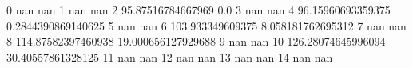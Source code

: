 0 nan nan
1 nan nan
2 95.87516784667969 0.0
3 nan nan
4 96.15960693359375 0.2844390869140625
5 nan nan
6 103.933349609375 8.058181762695312
7 nan nan
8 114.87582397460938 19.000656127929688
9 nan nan
10 126.28074645996094 30.40557861328125
11 nan nan
12 nan nan
13 nan nan
14 nan nan
